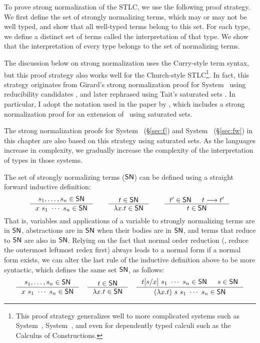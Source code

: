 To prove strong normalization of the STLC, we use the following proof strategy.
We first define the set of strongly normalizing terms, which may or may not be
well typed, and show that all well-typed terms belong to this set.
For each type, we define a distinct set of terms called the interpretation
of that type. We show that the interpretation of every type
belongs to the set of normalizing terms.

The discussion below on strong normalization uses the
Curry-style term syntax, but this proof strategy also works well
for the Church-style STLC\footnote{This proof strategy generalizes well
        to more complicated systems such as System~\F, System~\Fw, and
        even for dependently typed calculi such as
        the Calculus of Constructions\cite{Geuvers94}.}.
In fact, this strategy originates from Girard's strong normalization proof
for System \F\ using reducibility candidates \cite{Gir71}, and later rephrased
using Tait's saturated sets \cite{Tait75}. In particular, I adopt
the notation used in the paper by \citet{AbeMat04}, which includes
a strong normalization proof for an extension of \Fw\ using saturated sets.

The strong normalization proofs for System \F\ (\S\ref{sec:f}) and
System \Fw\ (\S\ref{sec:fw}) in this chapter 
are also based on this strategy using saturated sets. As the languages
increase in complexity, we gradually
increase the complexity of the interpretation of types in those systems.

The set of strongly normalizing terms ($\mathsf{SN}$) can be defined
using a straight forward inductive definition:
\[
\inference{s_1,\ldots,s_n\in\SN}{x~s_1~\cdots~s_n \in \SN}
\qquad
\inference{t \in \SN}{\l x.t \in \SN}
\qquad
\inference{t' \in \SN & t --> t'}{t \in \SN}
\]
That is, variables and applications of a variable to strongly normalizing terms
are in $\mathsf{SN}$, abstractions are in $\mathsf{SN}$ when their bodies are in $\mathsf{SN}$,
and terms that reduce to $\mathsf{SN}$ are also in $\mathsf{SN}$. Relying on the fact that
normal order reduction (\ie, reduce the outermost leftmost redex first) always
leads to a normal form if a normal form exists, we can alter the last rule of
the inductive definition above to be more syntactic, which defines the same set
$\mathsf{SN}$, as follows:
\[
\inference{s_1,\ldots,s_n\in\SN}{x~s_1~\cdots~s_n \in \SN}
\quad
\inference{t \in \SN}{\l x.t \in \SN}
\quad
\inference{t[s/x]~s_1~\cdots~s_n\in \SN & s\in\SN}
        {(\lambda x.t)~s~s_1~\cdots~s_n \in \SN}
\]

